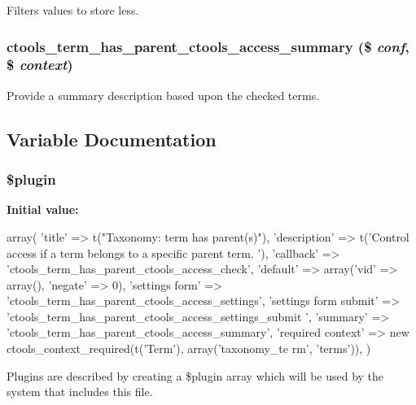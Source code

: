 \label{term__has__parent_8inc_a764b12f323c0759a9eb277a33b287c57}
Filters values to store less. \hypertarget{term__has__parent_8inc_a398c547268a6a2cb4562f27a6f369ebd}{
\subsubsection[{ctools\_\-term\_\-has\_\-parent\_\-ctools\_\-access\_\-summary}]{\setlength{\rightskip}{0pt plus 5cm}ctools\_\-term\_\-has\_\-parent\_\-ctools\_\-access\_\-summary (\$ {\em conf}, \/  \$ {\em context})}}
\label{term__has__parent_8inc_a398c547268a6a2cb4562f27a6f369ebd}
Provide a summary description based upon the checked terms. 

\subsection{Variable Documentation}
\hypertarget{term__has__parent_8inc_ada8a7130088351710bb02ed622d6bf65}{
\subsubsection[{\$plugin}]{\setlength{\rightskip}{0pt plus 5cm}\$plugin}}
\label{term__has__parent_8inc_ada8a7130088351710bb02ed622d6bf65}
{\bfseries Initial value:}
\begin{DoxyCode}
 array(
  'title' => t("Taxonomy: term has parent(s)"),
  'description' => t('Control access if a term belongs to a specific parent term.
      '),
  'callback' => 'ctools_term_has_parent_ctools_access_check',
  'default' => array('vid' => array(), 'negate' => 0),
  'settings form' => 'ctools_term_has_parent_ctools_access_settings',
  'settings form submit' => 'ctools_term_has_parent_ctools_access_settings_submit
      ',
  'summary' => 'ctools_term_has_parent_ctools_access_summary',
  'required context' => new ctools_context_required(t('Term'), array('taxonomy_te
      rm', 'terms')),
)
\end{DoxyCode}
Plugins are described by creating a \$plugin array which will be used by the system that includes this file. 